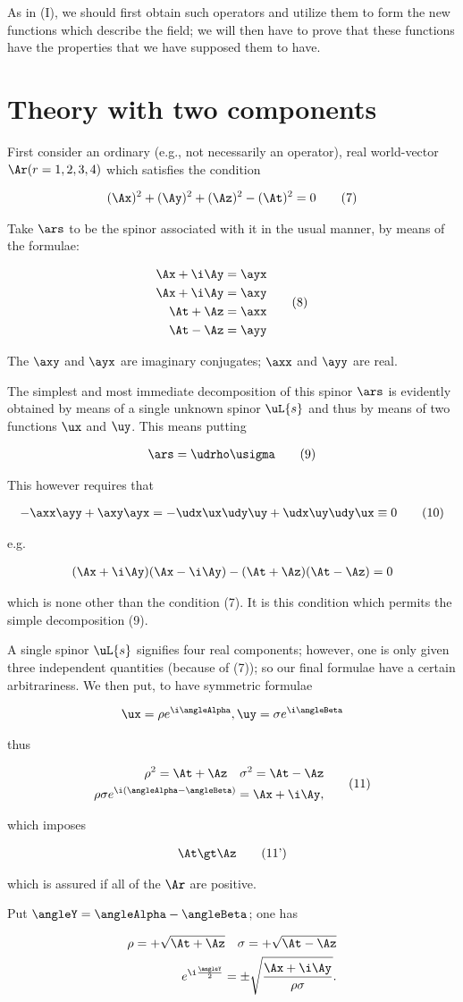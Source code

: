 \documentclass{article}
\newcommand{\nequ}[2]{
\begin{align*}
#1
\tag{#2}
\end{align*}
}
\newcommand{\uequ}[1]{
\begin{align*}
#1
\end{align*}
}
\newcommand{\const}[1]{#1}
\renewcommand{\exp}[1]{\const{e}^{#1}}
\begin{document}
\begin{multicols}{2}
As in (I), we should first obtain such operators and utilize them to form the new functions which describe the field; we will then have to prove that these functions have the properties that we have supposed them to have.

\section{Theory with two components}
First consider an ordinary (e.g., not necessarily an operator), real world-vector $\Ar (r=1,2,3,4)$ which satisfies the condition
\nequ{
(\Ax)^2 + (\Ay)^2 + (\Az)^2 - (\At)^2 = 0
}{7}
Take $\ars$ to be the spinor associated with it in the usual manner, by means of the formulae:
\nequ{
\begin{split}
\Ax + \i\Ay = \ayx\\
\Ax + \i\Ay = \axy\\
\At + \Az = \axx\\
\At - \Az = \ayy
\end{split}
}{8}

The $\axy$ and $\ayx$ are imaginary conjugates; $\axx$ and $\ayy$ are real.

The simplest and most immediate decomposition of this spinor $\ars$ is evidently obtained by means of a single unknown spinor $\uL{s}$ and thus by means of two functions $\ux$ and $\uy$. This means putting
\nequ{
\ars = \udrho\usigma
}{9}

This however requires that
\nequ{
-\axx\ayy + \axy\ayx = -\udx\ux\udy\uy + \udx\uy\udy\ux \equiv 0
}{10}
e.g.
\uequ{
(\Ax + \i\Ay)(\Ax - \i\Ay) - (\At + \Az)(\At - \Az) = 0
}
which is none other than the condition (7). It is this condition which permits the simple decomposition (9).

A single spinor $\uL{s}$ signifies four real components; however, one is only given three independent quantities (because of (7)); so our final formulae have a certain arbitrariness. We then put, to have symmetric formulae
\uequ{
\ux = \rho\exp{\i\angleAlpha}, \uy = \sigma\exp{\i\angleBeta}
}
thus
\nequ{
\begin{split}
\rho^2 = \At + \Az\quad\sigma^2 = \At - \Az\\
\rho\sigma\exp{\i(\angleAlpha-\angleBeta)} = \Ax + \i\Ay,
\end{split}
}{11}
which imposes
\nequ{
\At \gt \Az
}{11'}
which is assured if all of the $\Ar$ are positive.

Put $\angleY = \angleAlpha - \angleBeta$; one has
\uequ{
\begin{split}
\rho = +\sqrt{\At + \Az}\quad\sigma = +\sqrt{\At - \Az}\\
\exp{\i\frac{\angleY}{2}} = \pm\sqrt{\frac{\Ax+\i\Ay}{\rho\sigma}}.
\end{split}
}


\end{multicols}
\end{document}
